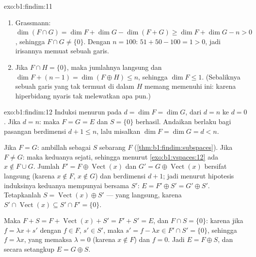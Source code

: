 \begin{solution}{exo:b1:findim:11}
\begin{enumerate}
  \item Grassmann: $\dim(F \cap G) = \dim F + \dim G - \dim(F +
        G) \geq \dim F + \dim G - n > 0$, sehingga $F \cap G \neq
        \{0\}$. Dengan $n = 100$: $51 + 50 - 100 = 1 > 0$, jadi
        irisannya memuat sebuah garis.
  \item Jika $F \cap H = \{0\}$, maka jumlahnya langsung dan $\dim F +
        (n - 1) = \dim(F \oplus H) \leq n$, sehingga $\dim F \leq 1$.
        (Sebaliknya sebuah garis yang tak termuat di dalam $H$ memang
        memenuhi ini: karena hiperbidang nyaris tak melewatkan apa pun.)
\end{enumerate}
\end{solution}

\begin{solution}{exo:b1:findim:12}
Induksi menurun pada $d = \dim F = \dim G$, dari $d = n$ ke $d =
0$. Jika $d = n$: maka $F = G = E$ dan $S = \{0\}$ berhasil. Andaikan
 berlaku bagi pasangan  berdimensi $d + 1 \leq n$,
lalu misalkan $\dim F = \dim G = d < n$.

Jika $F = G$: ambillah sebagai $S$ sebarang  $F$
(\cref{thm:b1:findim:subspaces}). Jika $F \neq G$: maka keduanya sejati,
sehingga menurut \cref{exo:b1:vspaces:12} ada $x \notin F \cup G$.
Jumlah $F' = F \oplus \operatorname{Vect}(x)$ dan $G' = G \oplus
\operatorname{Vect}(x)$ bersifat langsung (karena $x \notin F$, $x \notin G$)
dan berdimensi $d + 1$; jadi menurut hipotesis induksinya keduanya
mempunyai  bersama $S'$: $E = F' \oplus S' = G' \oplus
S'$. Tetapkanlah $S = \operatorname{Vect}(x) \oplus S'$ --- yang langsung,
karena $S' \cap \operatorname{Vect}(x) \subseteq S' \cap F' =
\{0\}$.

Maka $F + S = F + \operatorname{Vect}(x) + S' = F' + S' = E$, dan
$F \cap S = \{0\}$: karena jika $f = \lambda x + s'$ dengan $f \in F$, $s'
\in S'$, maka $s' = f - \lambda x \in F' \cap S' = \{0\}$, sehingga $f
= \lambda x$, yang memaksa $\lambda = 0$ (karena $x \notin F$) dan $f = 0$.
Jadi $E = F \oplus S$, dan secara setangkup $E = G \oplus S$.
\end{solution}

